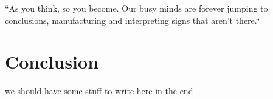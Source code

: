 
\begin{savequote}[85mm]
``As you think, so you become. Our busy minds are forever jumping to conclusions, manufacturing and interpreting signs that aren’t there.``
\end{savequote}


\chapter{Conclusion}
\label{ch:conclusion}


we should have some stuff to write here in the end